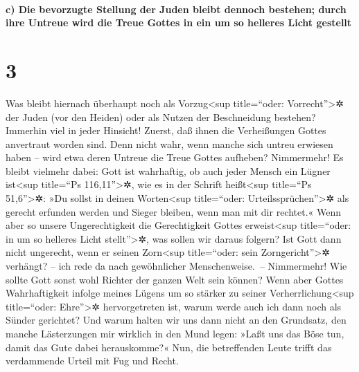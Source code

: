 \hypertarget{c-die-bevorzugte-stellung-der-juden-bleibt-dennoch-bestehen-durch-ihre-untreue-wird-die-treue-gottes-in-ein-um-so-helleres-licht-gestellt}{%
\paragraph{c) Die bevorzugte Stellung der Juden bleibt dennoch bestehen;
durch ihre Untreue wird die Treue Gottes in ein um so helleres Licht
gestellt}\label{c-die-bevorzugte-stellung-der-juden-bleibt-dennoch-bestehen-durch-ihre-untreue-wird-die-treue-gottes-in-ein-um-so-helleres-licht-gestellt}}

\hypertarget{section-2}{%
\section{3}\label{section-2}}

 Was bleibt hiernach überhaupt noch als
Vorzug\textless sup title=``oder: Vorrecht''\textgreater✲ der Juden (vor
den Heiden) oder als Nutzen der Beschneidung bestehen? 
Immerhin viel in jeder Hinsicht! Zuerst, daß ihnen die Verheißungen
Gottes anvertraut worden sind.  Denn nicht wahr, wenn
manche sich untreu erwiesen haben -- wird etwa deren Untreue die Treue
Gottes aufheben?  Nimmermehr! Es bleibt vielmehr dabei:
Gott ist wahrhaftig, ob auch jeder Mensch ein Lügner ist\textless sup
title=``Ps 116,11''\textgreater✲, wie es in der Schrift
heißt\textless sup title=``Ps 51,6''\textgreater✲: »Du sollst in deinen
Worten\textless sup title=``oder: Urteilssprüchen''\textgreater✲ als
gerecht erfunden werden und Sieger bleiben, wenn man mit dir rechtet.«
 Wenn aber so unsere Ungerechtigkeit die Gerechtigkeit
Gottes erweist\textless sup title=``oder: in um so helleres Licht
stellt''\textgreater✲, was sollen wir daraus folgern? Ist Gott dann
nicht ungerecht, wenn er seinen Zorn\textless sup title=``oder: sein
Zorngericht''\textgreater✲ verhängt? -- ich rede da nach gewöhnlicher
Menschenweise.~--  Nimmermehr! Wie sollte Gott sonst wohl
Richter der ganzen Welt sein können?  Wenn aber Gottes
Wahrhaftigkeit infolge meines Lügens um so stärker zu seiner
Verherrlichung\textless sup title=``oder: Ehre''\textgreater✲
hervorgetreten ist, warum werde auch ich dann noch als Sünder gerichtet?
 Und warum halten wir uns dann nicht an den Grundsatz, den
manche Lästerzungen mir wirklich in den Mund legen: »Laßt uns das Böse
tun, damit das Gute dabei herauskomme?« Nun, die betreffenden Leute
trifft das verdammende Urteil mit Fug und Recht.

